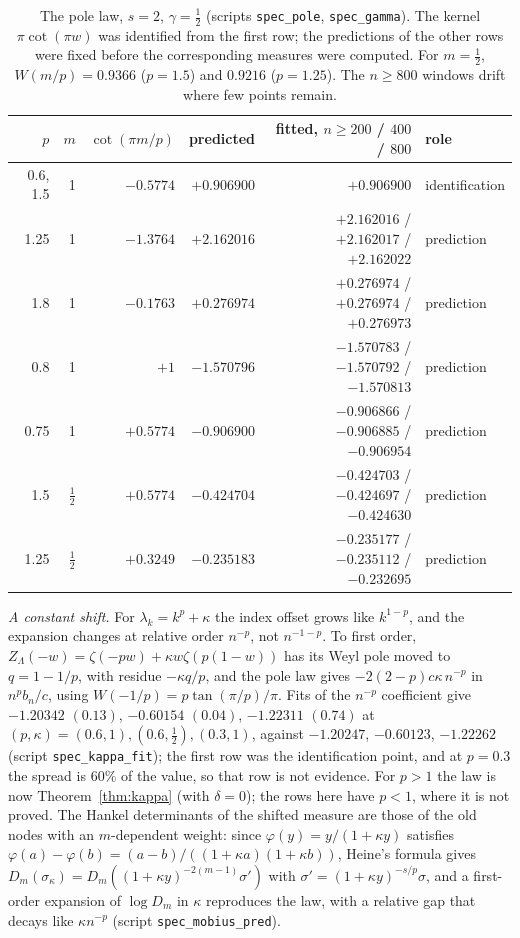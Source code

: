 \begin{table}[ht]
\centering
\small
\begin{tabular}{rrrrrl}
\toprule
$p$ & $m$ & $\cot(\pi m/p)$ & predicted & fitted, $n\ge200$ / $400$ / $800$ & role\\
\midrule
0.6, 1.5 & 1 & $-0.5774$ & $+0.906900$ & $+0.906900$ & identification\\
1.25 & 1 & $-1.3764$ & $+2.162016$ & $+2.162016$ / $+2.162017$ / $+2.162022$ & prediction\\
1.8 & 1 & $-0.1763$ & $+0.276974$ & $+0.276974$ / $+0.276974$ / $+0.276973$ & prediction\\
0.8 & 1 & $+1$ & $-1.570796$ & $-1.570783$ / $-1.570792$ / $-1.570813$ & prediction\\
0.75 & 1 & $+0.5774$ & $-0.906900$ & $-0.906866$ / $-0.906885$ / $-0.906954$ & prediction\\
1.5 & $\frac12$ & $+0.5774$ & $-0.424704$ & $-0.424703$ / $-0.424697$ / $-0.424630$ & prediction\\
1.25 & $\frac12$ & $+0.3249$ & $-0.235183$ & $-0.235177$ / $-0.235112$ / $-0.232695$ & prediction\\
\bottomrule
\end{tabular}
\caption{The pole law, $s=2$, $\gamma=\frac12$ (scripts \texttt{spec\_pole}, \texttt{spec\_gamma}). The kernel $\pi\cot(\pi w)$ was identified from
the first row; the predictions of the other rows were fixed before the corresponding measures were computed. For $m=\frac12$,
$W(m/p)=0.9366$ ($p=1.5$) and $0.9216$ ($p=1.25$). The $n\ge800$ windows drift where few points remain.}
\label{tab:pole}
\end{table}

\emph{A constant shift.} For $\lambda_k=k^p+\kappa$ the index offset grows like $k^{1-p}$, and the expansion changes at
relative order $n^{-p}$, not $n^{-1-p}$. To first order, $Z_\Lambda(-w)=\zeta(-pw)+\kappa w\zeta(p(1-w))$ has its Weyl pole moved
to $q=1-1/p$, with residue $-\kappa q/p$, and the pole law gives $-2(2-p)c\kappa\,n^{-p}$ in $n^pb_n/c$, using
$W(-1/p)=p\tan(\pi/p)/\pi$. Fits of the $n^{-p}$ coefficient give $-1.20342$ $(0.13)$, $-0.60154$ $(0.04)$, $-1.22311$ $(0.74)$
at $(p,\kappa)=(0.6,1),(0.6,\frac12),(0.3,1)$, against $-1.20247$, $-0.60123$, $-1.22262$ (script \texttt{spec\_kappa\_fit}); the
first row was the identification point, and at $p=0.3$ the spread is $60\%$ of the value, so that row is not evidence.
For $p>1$ the law is now Theorem~\ref{thm:kappa} (with $\delta=0$); the rows here have $p<1$, where it is not proved.
The Hankel determinants of the shifted measure are those of the old nodes with an $m$-dependent weight: since
$\varphi(y)=y/(1+\kappa y)$ satisfies $\varphi(a)-\varphi(b)=(a-b)/((1+\kappa a)(1+\kappa b))$, Heine's formula gives
$D_m(\sigma_\kappa)=D_m((1+\kappa y)^{-2(m-1)}\sigma')$ with $\sigma'=(1+\kappa y)^{-s/p}\sigma$, and a first-order expansion of
$\log D_m$ in $\kappa$ reproduces the law, with a relative gap that decays like $\kappa n^{-p}$ (script \texttt{spec\_mobius\_pred}).

